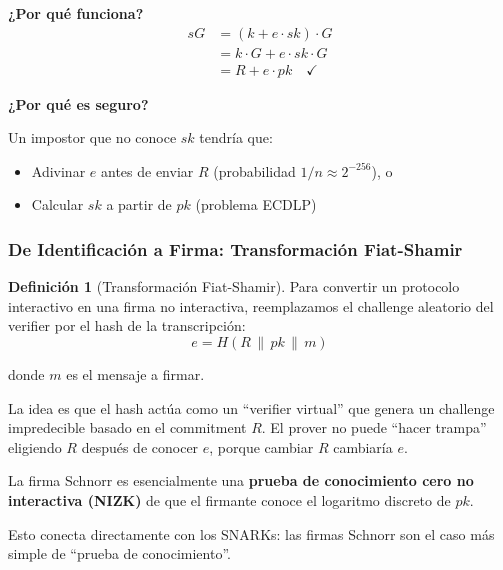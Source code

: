 \documentclass[11pt,a4paper,twoside,openright]{book}
\theoremstyle{definition}
\newtheorem{definition}{Definición}[chapter]
\theoremstyle{plain}
\theoremstyle{remark}
\begin{document}
\begin{mathnote}
\textbf{¿Por qué funciona?}
\begin{align}
sG &= (k + e \cdot sk) \cdot G \\
   &= k \cdot G + e \cdot sk \cdot G \\
   &= R + e \cdot pk \quad \checkmark
\end{align}

\textbf{¿Por qué es seguro?}

Un impostor que no conoce $sk$ tendría que:
\begin{itemize}
    \item Adivinar $e$ antes de enviar $R$ (probabilidad $1/n \approx 2^{-256}$), o
    \item Calcular $sk$ a partir de $pk$ (problema ECDLP)
\end{itemize}
\end{mathnote}

\subsubsection{De Identificación a Firma: Transformación Fiat-Shamir}

\begin{definition}[Transformación Fiat-Shamir]
Para convertir un protocolo interactivo en una firma no interactiva, reemplazamos el challenge aleatorio del verifier por el hash de la transcripción:
\[ e = H(R \,\|\, pk \,\|\, m) \]

donde $m$ es el mensaje a firmar.
\end{definition}

\begin{intuicion}
La idea es que el hash actúa como un ``verifier virtual'' que genera un challenge impredecible basado en el commitment $R$. El prover no puede ``hacer trampa'' eligiendo $R$ después de conocer $e$, porque cambiar $R$ cambiaría $e$.
\end{intuicion}

\begin{keyidea}
La firma Schnorr es esencialmente una \textbf{prueba de conocimiento cero no interactiva (NIZK)} de que el firmante conoce el logaritmo discreto de $pk$.

Esto conecta directamente con los SNARKs: las firmas Schnorr son el caso más simple de ``prueba de conocimiento''.
\end{keyidea}

\end{document}
